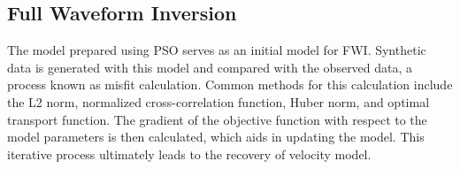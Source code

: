 \documentclass[paper,revised]{geophysics}
\begin{document}
\subsection{Full Waveform Inversion}
The model prepared using PSO serves as an initial model for FWI. Synthetic data is generated with this model and compared with the observed data, a process known as misfit calculation. Common methods for this calculation include the L2 norm, normalized cross-correlation function, Huber norm, and optimal transport function. The gradient of the objective function with respect to the model parameters is then calculated, which aids in updating the model. This iterative process ultimately leads to the recovery of velocity model.
\label{method}


\begin{acknowledgments}

\end{acknowledgments}



%


%

\newpage


\end{document}
